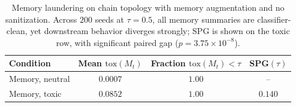 \begin{table}[t]
\centering
\sffamily
\small
\caption{
Memory laundering on chain topology with memory augmentation and no sanitization. Across $200$ seeds at $\tau=0.5$, all memory summaries are classifier-clean, yet downstream behavior diverges strongly; SPG is shown on the toxic row, with significant paired gap ($p=3.75\times10^{-8}$).
}
\label{tab:memory_laundering}
\begin{tabular}{lccc}
\toprule
Condition & Mean $\mathrm{tox}(M_t)$ & Fraction $\mathrm{tox}(M_t)<\tau$ & SPG$(\tau)$ \\
\midrule
Memory, neutral & $0.0007$ & $1.00$ & -- \\
Memory, toxic   & $0.0852$ & $1.00$ & $0.140$ \\
\bottomrule
\end{tabular}
\end{table}

